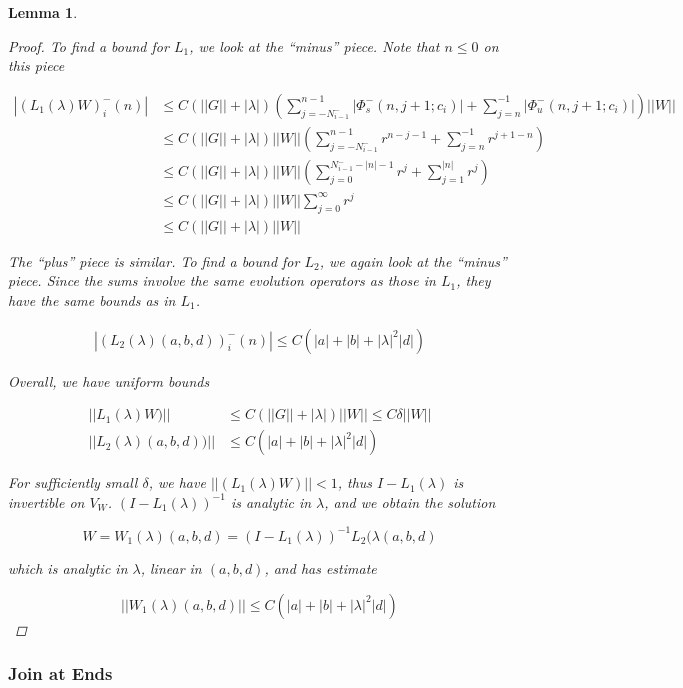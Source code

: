 \documentclass[12pt]{article}
\newtheorem{lemma}{Lemma}
\begin{document}
\begin{lemma}
\begin{proof}
To find a bound for $L_1$, we look at the ``minus'' piece. Note that $n \leq 0$ on this piece

\begin{align*}
|(L_1(\lambda)W)_i^-(n)| &\leq C (||G|| + |\lambda|)\left(
\sum_{j = -N_{i-1}^-}^{n-1} |\Phi_s^-(n, j+1; c_i)| + \sum_{j = n}^{-1} |\Phi_u^-(n, j+1; c_i)| \right) ||W|| \\
&\leq C (||G|| + |\lambda|) ||W||
\left( \sum_{j = -N_{i-1}^-}^{n-1} r^{n - j - 1} + \sum_{j = n}^{-1} r^{j+1-n} \right) \\
&\leq C (||G|| + |\lambda|) ||W||
\left( \sum_{j = 0}^{N_{i-1}^- -|n| -1} r^j + \sum_{j = 1}^{|n|} r^j \right) \\
&\leq C (||G|| + |\lambda|) ||W||\sum_{j = 0}^\infty r^j \\
&\leq C (||G|| + |\lambda|)||W||
\end{align*}

The ``plus'' piece is similar. To find a bound for $L_2$, we again look at the ``minus'' piece. Since the sums involve the same evolution operators as those in $L_1$, they have the same bounds as in $L_1$.

\begin{align*}
|(L_2(\lambda)(a,b,d))_i^-(n)| \leq C\left( |a| + |b| + |\lambda|^2 |d| \right)
\end{align*}

Overall, we have uniform bounds

\begin{align*}
||L_1(\lambda)W)|| &\leq C \left(||G|| + |\lambda| \right)||W|| \leq C \delta ||W|| \\
||L_2(\lambda)(a,b,d))|| &\leq C\left( |a| + |b| + |\lambda|^2 |d| \right)
\end{align*}

For sufficiently small $\delta$, we have $||(L_1(\lambda)W)|| < 1$, thus $I - L_1(\lambda)$ is invertible on $V_W$. $(I - L_1(\lambda))^{-1}$ is analytic in $\lambda$, and we obtain the solution 

\[
W = W_1(\lambda)(a,b,d) = (I - L_1(\lambda))^{-1} L_2(\lambda(a,b,d)
\]

which is analytic in $\lambda$, linear in $(a, b, d)$, and has estimate

\[
||W_1(\lambda)(a,b,d)|| \leq C \left( |a| + |b| + |\lambda|^2 |d| \right)
\]

\end{proof}
\end{lemma}

\subsubsection{Join at Ends}
\end{document}
